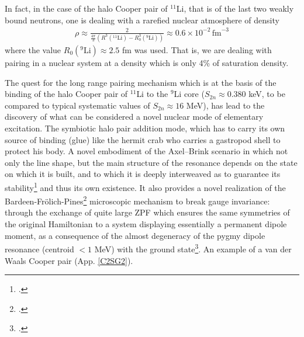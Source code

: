 In fact, in the case of the halo Cooper pair of $^{11}$Li, that is of the last two weakly bound neutrons, one is dealing with a rarefied nuclear atmosphere of density
\begin{align}\label{eq5App3E}
\rho\approx\frac{2}{\frac{4\pi}{3}(R^3(^{11}\text{Li})-R_0^3(^{9}\text{Li}))}\approx 0.6\times 10^{-2}\,\text{fm}^{-3}
\end{align}
where the value $R_0(^9\text{Li})\approx 2.5$ fm was used. That is, we are dealing with pairing in a nuclear system at a density which is only 4\% of saturation density.

The quest for the long range pairing mechanism which is at the basis of the binding of the halo Cooper pair of $^{11}$Li to the $^9$Li core ($S_{2n}\approx0.380$ keV, to be compared to typical systematic values of $S_{2n}\approx 16$ MeV), has lead to the discovery of what can be considered a novel nuclear mode of elementary excitation. The symbiotic halo pair addition mode, which has to carry its own source of binding (glue) like the hermit crab who carries a gastropod shell to protect his body. A novel embodiment of the Axel--Brink scenario in which not only the line shape, but the main structure of the resonance depends on the state on which it is built, and to which it is deeply interweaved as to guarantee its stability\footnote{\cite{Axel:62,Brink:55}.} and thus its own existence. It also provides a novel realization of the Bardeen-Fr\"olich-Pines\footnote{\cite{Bardeen:55,Frohlich:52}.} microscopic mechanism to break gauge invariance: through the exchange of quite large ZPF which ensures the same symmetries of the original Hamiltonian to a system displaying essentially a permanent dipole moment, as a consequence of the almost degeneracy of the  pygmy dipole resonance (centroid $<1$ MeV) with the ground state\footnote{\cite{Aumann:19}.}. An example of a van der Waals Cooper pair (App. \ref{C2SG2}).


